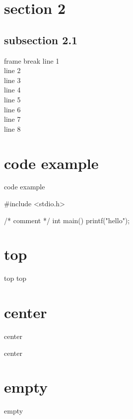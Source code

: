 \documentclass{beamer}
\begin{document}
\section{section 2}
\subsection{subsection 2.1}
\begin{frame}[allowframebreaks]{frame break}
  line 1\\
  line 2\\
  line 3\\
  line 4\\
  \framebreak
  line 5\\
  line 6\\
  line 7\\
  line 8\\
\end{frame}

\section{code example}
\begin{frame}[fragile]{code example}
\begin{ccode}
#include <stdio.h>

/* comment */
int main() {
  printf("hello\n");
}
\end{ccode}
\end{frame}

\section{top}
\begin{frame}[t]{top}
  top
\end{frame}

\section{center}
\begin{frame}[c]{center}
  \begin{center}
    center
  \end{center}
\end{frame}

\section{empty}
\begin{frame}{empty}
  ~
\end{frame}
\end{document}
